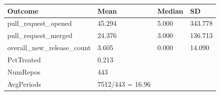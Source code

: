 
\begin{tabular}{llll}
\toprule
Outcome & Mean & Median & SD\\
\midrule
pull\_request\_opened & 45.294 & 5.000 & 343.778\\
pull\_request\_merged & 24.376 & 3.000 & 136.713\\
overall\_new\_release\_count & 3.605 & 0.000 & 14.090\\
\midrule
PctTreated & 0.213 &  &  \\
NumRepos & 443 &  &  \\
AvgPeriods & 7512/443 = 16.96 &  &  \\
\bottomrule
\end{tabular}
